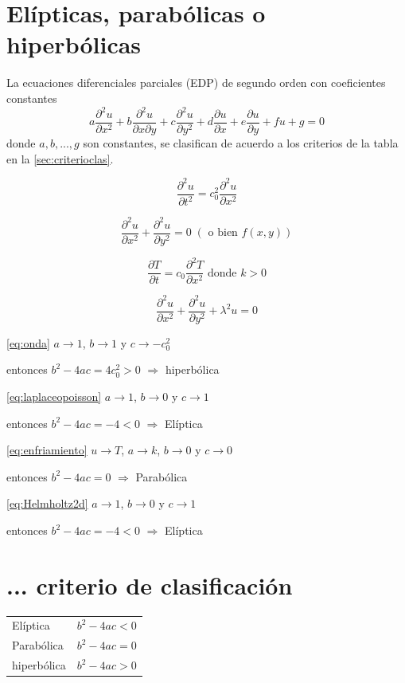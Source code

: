 \documentclass{article}
\newcommand\pder[2]{\ensuremath
{\dfrac{\partial#1}{\partial#2}}}
\newcommand{\ppder}[2]{ \ensuremath {\dfrac{\partial^2
#1}{\partial #2^2}}}
\newcommand{\ppcder}[3]{ \ensuremath {\dfrac{\partial^2
#1}{\partial #2\partial #3}}}
\numberwithin{figure}{section}
\numberwithin{equation}{section} %
\begin{document}
\section{Elípticas, parabólicas o hiperbólicas}
La ecuaciones diferenciales parciales (EDP) de segundo orden
con coeficientes constantes 
\begin{equation}
 a\ppder{u}{x} + b\ppcder{u}{x}{y} + c\ppder{u}{y} +
  d\pder{u}{x} + e\pder{u}{y} + fu + g = 0
  \label{eq:pdeg}
\end{equation}
donde ${a,b, ..., g}$ son constantes, 
se clasifican de acuerdo a los criterios de la tabla en 
la \autoref{sec:criterioclas}.

\begin{equation}
\ppder{u}{t} = c_0^2 \ppder{u}{x}
\label{eq:onda}
\end{equation}

\begin{equation}
\ppder{u}{x} + \ppder{u}{y} = 0 \; (\text{ o bien } f(x,y))
\label{eq:laplaceopoisson}
\end{equation}

\begin{equation}
\pder{T}{t} = c_0 \ppder{T}{x} \text{ donde } k>0
\label{eq:enfriamiento}
\end{equation}

\begin{equation}
\ppder{u}{x} + \ppder{u}{y} + \lambda^2 u = 0
\label{eq:Helmholtz2d}
\end{equation}

\autoref{eq:onda} $a \rightarrow 1$, $b \rightarrow 1$ y $c \rightarrow - c_0^2$

entonces $b^2 -4ac = 4 c_0^2 > 0$ $\Rightarrow$ hiperbólica

\autoref{eq:laplaceopoisson} $a \rightarrow 1$, $b \rightarrow 0$ y $c \rightarrow 1$

entonces $b^2 -4ac = -4 < 0$ $\Rightarrow$ Elíptica

\autoref{eq:enfriamiento} $u \rightarrow T$, $a \rightarrow k$, $b \rightarrow 0$ y $c \rightarrow 0$

entonces $b^2 -4ac = 0$ $\Rightarrow$ Parabólica

\autoref{eq:Helmholtz2d} $a \rightarrow 1$, $b \rightarrow 0$ y $c \rightarrow 1$

entonces $b^2 -4ac = -4 < 0$ $\Rightarrow$ Elíptica

\section{... criterio de clasificación}\label{sec:criterioclas}
\begin{center}
\begin{tabular}{lc}
\hline
	Elíptica & $b^2 - 4ac < 0$\\
	Parabólica & $b^2 - 4ac = 0$\\
	hiperbólica & $b^2 - 4ac > 0$\\
\hline
\end{tabular}
\end{center}
\end{document}
